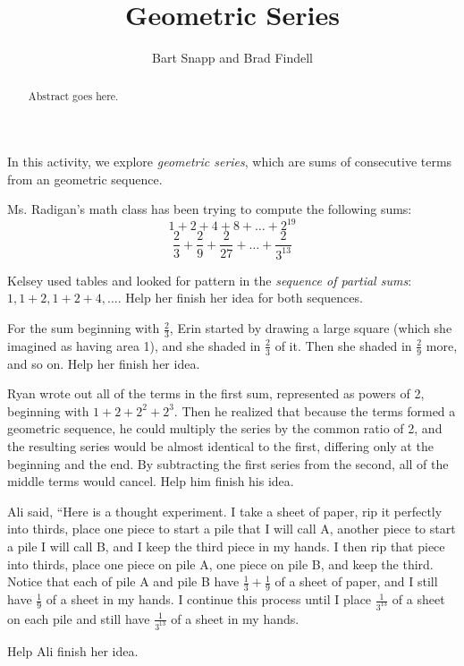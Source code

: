 \documentclass{ximera}
\title{Geometric Series}
\author{Bart Snapp and Brad Findell}
\begin{document}
\begin{abstract}
Abstract goes here.  
\end{abstract}
\maketitle

\label{A:geometicSeries}

In this activity, we explore \emph{geometric series}, which are sums of consecutive terms from an geometric sequence.

Ms. Radigan's math class has been trying to compute the following sums:  
$$1+2+4+8+\dots+2^{19}$$
$$\frac{2}{3}+\frac{2}{9}+\frac{2}{27}+\dots+\frac{2}{3^{13}}$$

\begin{problem}
Kelsey used tables and looked for pattern in the \emph{sequence of partial sums}:  $1, 1+2, 1+2+4, \dots$.  Help her finish her idea for both sequences.    
\end{problem}

\begin{problem}
For the sum beginning with $\frac{2}{3}$, Erin started by drawing a large square (which she imagined as having area 1), and she shaded in $\frac{2}{3}$ of it.  Then she shaded in $\frac{2}{9}$ more, and so on.  Help her finish her idea.  
\end{problem}

\begin{problem}
Ryan wrote out all of the terms in the first sum, represented as powers of 2, beginning with $1+2+2^2+2^3$.  
Then he realized that because the terms formed a geometric sequence, he could multiply the series by the common ratio of 2, and the resulting series would be almost identical to the first, differing only at the beginning and the end.  By subtracting the first series from the second, all of the middle terms would cancel.  Help him finish his idea.  
\end{problem}

\begin{problem}
Ali said, ``Here is a thought experiment.  I take a sheet of paper, rip it perfectly into thirds, place one piece to start a pile that I will call A, another piece to start a pile I will call B, and I keep the third piece in my hands.  I then rip that piece into thirds, place one piece on pile A, one piece on pile B, and keep the third.  Notice that each of pile A and pile B have $\frac{1}{3}+\frac{1}{9}$ of a sheet of paper, and I still have $\frac{1}{9}$ of a sheet in my hands.  I continue this process until I place $\frac{1}{3^{13}}$ of a sheet on each pile and still have $\frac{1}{3^{13}}$ of a sheet in my hands.  

Help Ali finish her idea.  
\end{problem}
\end{document}

